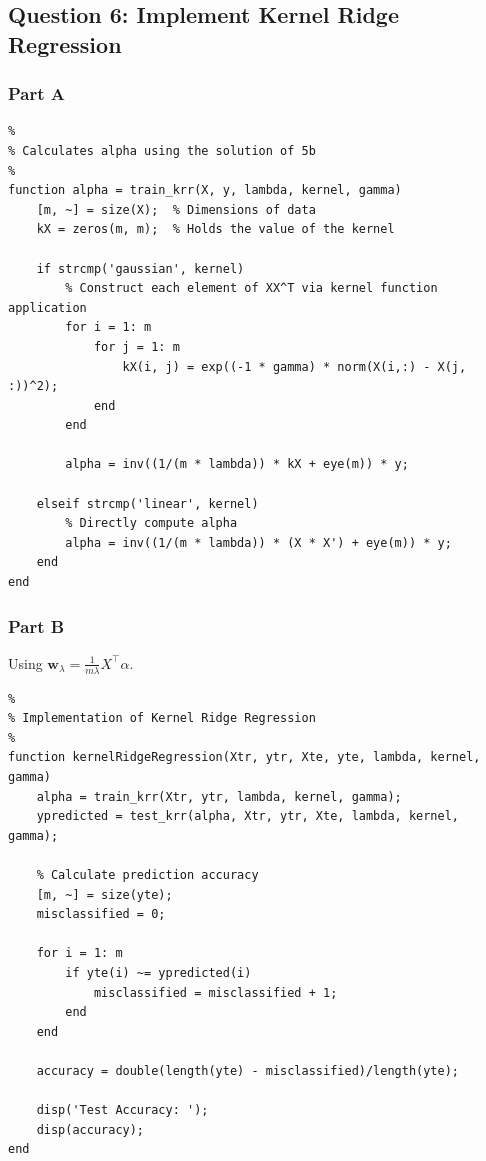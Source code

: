 \documentclass[11pt, oneside]{article}   	%
\begin{document}
\newpage{}
\subsection{Question 6: Implement Kernel Ridge Regression}
\subsubsection{Part A}
\begin{verbatim}
%
% Calculates alpha using the solution of 5b
%
function alpha = train_krr(X, y, lambda, kernel, gamma)
    [m, ~] = size(X);  % Dimensions of data
    kX = zeros(m, m);  % Holds the value of the kernel
    
    if strcmp('gaussian', kernel)
        % Construct each element of XX^T via kernel function application
        for i = 1: m
            for j = 1: m
                kX(i, j) = exp((-1 * gamma) * norm(X(i,:) - X(j, :))^2);
            end
        end
        
        alpha = inv((1/(m * lambda)) * kX + eye(m)) * y;
        
    elseif strcmp('linear', kernel)
        % Directly compute alpha
        alpha = inv((1/(m * lambda)) * (X * X') + eye(m)) * y;
    end   
end
\end{verbatim}

\newpage{}
\subsubsection{Part B}
Using $\boldsymbol{w}_\lambda = \frac{1}{m\lambda }X^\top \alpha$.
\begin{verbatim}
%
% Implementation of Kernel Ridge Regression
%
function kernelRidgeRegression(Xtr, ytr, Xte, yte, lambda, kernel, gamma)
    alpha = train_krr(Xtr, ytr, lambda, kernel, gamma);
    ypredicted = test_krr(alpha, Xtr, ytr, Xte, lambda, kernel, gamma);
    
    % Calculate prediction accuracy
    [m, ~] = size(yte);
    misclassified = 0;
    
    for i = 1: m
        if yte(i) ~= ypredicted(i)
            misclassified = misclassified + 1;
        end
    end
    
    accuracy = double(length(yte) - misclassified)/length(yte);
    
    disp('Test Accuracy: ');
    disp(accuracy);
end
\end{verbatim}
\end{document}
